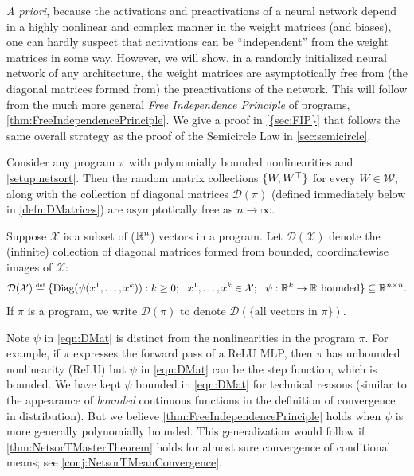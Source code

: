 \documentclass[main.tex]{subfiles}
\begin{document}
\emph{A priori}, because the activations and preactivations of a neural network depend in a highly nonlinear and complex manner in the weight matrices (and biases), one can hardly suspect that activations can be ``independent'' from the weight matrices in some way. 
However, we will show, in a randomly initialized neural network of any architecture, the weight matrices are asymptotically free from (the diagonal matrices formed from) the preactivations of the network.
This will follow from the much more general \emph{Free Independence Principle} of \netsort{} programs, \cref{thm:FreeIndependencePrinciple}.
We give a proof in \cref{{sec:FIP}} that follows the same overall strategy as the proof of the Semicircle Law in \cref{sec:semicircle}.
\begin{thm}
\label{thm:FreeIndependencePrinciple} Consider any \netsort{} program $\pi$ with polynomially bounded nonlinearities
and \cref{setup:netsort}. Then the random matrix collections $\{W,W^{\top}\}$ for every $W\in\mathcal{W}$, along with the collection of diagonal matrices $\mathcal D(\pi)$ (defined immediately below in \cref{defn:DMatrices}) are asymptotically free as $n\to\infty$.
\end{thm}
\begin{defn}\label{defn:DMatrices}
    Suppose $\mathcal X$ is a subset of ($\mathbb{R}^n$) vectors in a program.
    Let $\mathcal D(\mathcal X)$ denote the (infinite) collection of diagonal matrices formed from bounded, coordinatewise images of $\mathcal X$:
    \begin{equation}\mathcal D(\mathcal X) \defeq \{\Diag(\psi(x^1,\ldots, x^k)): k \ge 0;\ \ x^1, \ldots, x^k \in \mathcal X;\ \ \psi: \R^k \to \R \text{ bounded}\} \sbe \R^{n\times n}.
        \label{eqn:DMat}
    \end{equation}
    If $\pi$ is a program, we write $\mathcal D(\pi)$ to denote $\mathcal D(\{\text{all vectors in $\pi$}\})$.
\end{defn}

Note $\psi$ in \cref{eqn:DMat} is distinct from the nonlinearities in the program $\pi$.
For example, if $\pi$ expresses the forward pass of a ReLU MLP, then $\pi$ has unbounded nonlinearity (ReLU) but $\psi$ in \cref{eqn:DMat} can be the step function, which is bounded.
We have kept $\psi$ bounded in \cref{eqn:DMat} for technical reasons (similar to the appearance of \emph{bounded} continuous functions in the definition of convergence in distribution).
But we believe \cref{thm:FreeIndependencePrinciple} holds when $\psi$ is more generally polynomially bounded.
This generalization would follow if \cref{thm:NetsorTMasterTheorem} holds for almost sure convergence of conditional means; see \cref{conj:NetsorTMeanConvergence}.
\end{document}
